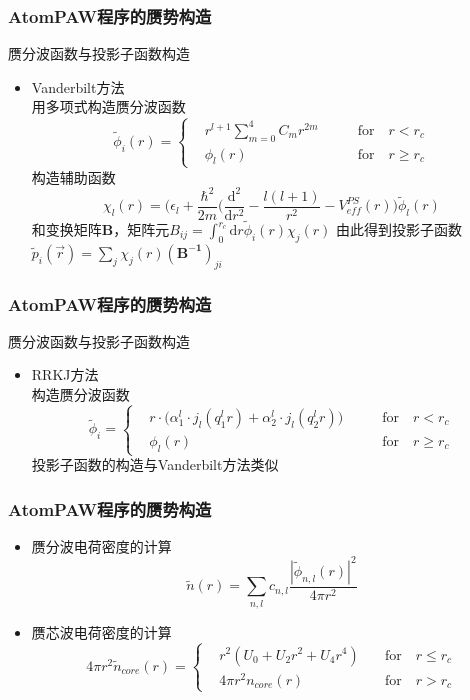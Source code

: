 \documentclass[cjk,slidestop,compress,mathserif,blue]{beamer}
\begin{document}
\frame
{
	\frametitle{\textrm{AtomPAW}程序的赝势构造}
	赝分波函数与投影子函数构造
	\begin{itemize}
		\item \textrm{Vanderbilt}方法\\
			用多项式构造赝分波函数
	\begin{displaymath}
		\tilde\phi_i(r)=\left\{
			\begin{aligned}
				&r^{l+1}\sum_{m=0}^4C_mr^{2m}\qquad &\mathrm{for}\quad r<r_c \\
				&\phi_l(r)\qquad &\mathrm{for}\quad r\geqslant r_c
			\end{aligned}
			\right.
	\end{displaymath}
	构造辅助函数
	$$\chi_l(r)=\bigg(\epsilon_l+\dfrac{\hbar^2}{2m}(\dfrac{\mathrm{d}^2}{\mathrm{d}r^2}-\dfrac{l(l+1)}{r^2}-V_{e\!f\!f}^{PS}(r)\bigg)\tilde\phi_l(r)$$
	和变换矩阵\textbf{B}，矩阵元$B_{ij}=\int_0^{r_c}\mathrm{d}r\tilde\phi_i(r)\chi_j(r)$
	由此得到投影子函数$\tilde p_i(\vec r)=\sum_{j}\chi_j(r)(\mathbf{B^{-1}})_{ji}$
	\end{itemize}
}


\frame
{
	\frametitle{\textrm{AtomPAW}程序的赝势构造}
	赝分波函数与投影子函数构造
	\begin{itemize}
		\item \textrm{RRKJ}方法\\
		构造赝分波函数
	\begin{displaymath}
		\tilde\phi_i=\left\{
			\begin{aligned}
				&r\cdot\bigg(\alpha_1^l\cdot j_l(q_1^lr)+\alpha_2^l\cdot j_l(q_2^lr)\bigg) \qquad &\mathrm{for}\quad r<r_c \\
				&\phi_l(r)\qquad &\mathrm{for}\quad r\geqslant r_c
			\end{aligned}
			\right.
	\end{displaymath}
	投影子函数的构造与\textrm{Vanderbilt}方法类似
	\end{itemize}
}


\frame
{
	\frametitle{\textrm{AtomPAW}程序的赝势构造}
	\begin{itemize}
		\item 赝分波电荷密度的计算
	$$\tilde n(r)=\sum_{n,l}c_{n,l}\dfrac{|\tilde\phi_{n,l}(r)|^2}{4\pi r^2}$$
		\item 赝芯波电荷密度的计算
	\begin{displaymath}
		4\pi r^2\tilde n_{core}(r)=\left\{
			\begin{aligned}
				&r^2(U_0+U_2r^2+U_4r^4)\quad &\mathrm{for}\quad r\leqslant r_c \\
				&4\pi r^2n_{core}(r)\quad &\mathrm{for}\quad r>r_c
			\end{aligned}
			\right.
	\end{displaymath}
	\end{itemize}
}
\end{document}
